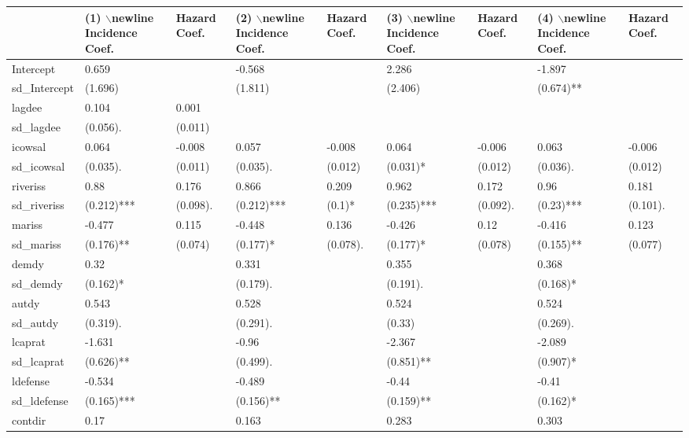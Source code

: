 \begin{table}[ht]
\centering
\begin{tabular}{lllllllll}
  \hline
  & (1) $\backslash$newline Incidence Coef. &  Hazard Coef. & (2) $\backslash$newline Incidence Coef. &  Hazard Coef. & (3) $\backslash$newline Incidence Coef. &  Hazard Coef. & (4) $\backslash$newline Incidence Coef. &  Hazard Coef. \\ 
  \hline
Intercept & 0.659 &  & -0.568 &  & 2.286 &  & -1.897 &  \\ 
  sd\_Intercept & (1.696)  &  & (1.811)  &  & (2.406)  &  & (0.674)** &  \\ 
  lagdee & 0.104 & 0.001 &  &  &  &  &  &  \\ 
  sd\_lagdee & (0.056). & (0.011)  &  &  &  &  &  &  \\ 
  icowsal & 0.064 & -0.008 & 0.057 & -0.008 & 0.064 & -0.006 & 0.063 & -0.006 \\ 
  sd\_icowsal & (0.035). & (0.011)  & (0.035). & (0.012)  & (0.031)* & (0.012)  & (0.036). & (0.012)  \\ 
  riveriss & 0.88 & 0.176 & 0.866 & 0.209 & 0.962 & 0.172 & 0.96 & 0.181 \\ 
  sd\_riveriss & (0.212)*** & (0.098). & (0.212)*** & (0.1)* & (0.235)*** & (0.092). & (0.23)*** & (0.101). \\ 
  mariss & -0.477 & 0.115 & -0.448 & 0.136 & -0.426 & 0.12 & -0.416 & 0.123 \\ 
  sd\_mariss & (0.176)** & (0.074)  & (0.177)* & (0.078). & (0.177)* & (0.078)  & (0.155)** & (0.077)  \\ 
  demdy & 0.32 &  & 0.331 &  & 0.355 &  & 0.368 &  \\ 
  sd\_demdy & (0.162)* &  & (0.179). &  & (0.191). &  & (0.168)* &  \\ 
  autdy & 0.543 &  & 0.528 &  & 0.524 &  & 0.524 &  \\ 
  sd\_autdy & (0.319). &  & (0.291). &  & (0.33)  &  & (0.269). &  \\ 
  lcaprat & -1.631 &  & -0.96 &  & -2.367 &  & -2.089 &  \\ 
  sd\_lcaprat & (0.626)** &  & (0.499). &  & (0.851)** &  & (0.907)* &  \\ 
  ldefense & -0.534 &  & -0.489 &  & -0.44 &  & -0.41 &  \\ 
  sd\_ldefense & (0.165)*** &  & (0.156)** &  & (0.159)** &  & (0.162)* &  \\ 
  contdir & 0.17 &  & 0.163 &  & 0.283 &  & 0.303 &  \\ 

\end{tabular}
\end{table}
